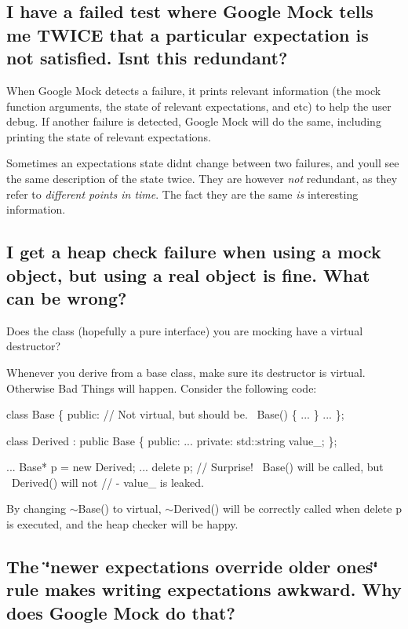 \subsection*{I have a failed test where Google Mock tells me T\+W\+I\+CE that a particular expectation is not satisfied. Isn\textquotesingle{}t this redundant?}

When Google Mock detects a failure, it prints relevant information (the mock function arguments, the state of relevant expectations, and etc) to help the user debug. If another failure is detected, Google Mock will do the same, including printing the state of relevant expectations.

Sometimes an expectation\textquotesingle{}s state didn\textquotesingle{}t change between two failures, and you\textquotesingle{}ll see the same description of the state twice. They are however {\itshape not} redundant, as they refer to {\itshape different points in time}. The fact they are the same {\itshape is} interesting information.

\subsection*{I get a heap check failure when using a mock object, but using a real object is fine. What can be wrong?}

Does the class (hopefully a pure interface) you are mocking have a virtual destructor?

Whenever you derive from a base class, make sure its destructor is virtual. Otherwise Bad Things will happen. Consider the following code\+:


\begin{DoxyCode}
class Base \{
 public:
  // Not virtual, but should be.
  ~Base() \{ ... \}
  ...
\};

class Derived : public Base \{
 public:
  ...
 private:
  std::string value\_;
\};

...
  Base* p = new Derived;
  ...
  delete p;  // Surprise! ~Base() will be called, but ~Derived() will not
             // - value\_ is leaked.
\end{DoxyCode}


By changing {\ttfamily $\sim$\+Base()} to virtual, {\ttfamily $\sim$\+Derived()} will be correctly called when {\ttfamily delete p} is executed, and the heap checker will be happy.

\subsection*{The \char`\"{}newer expectations override older ones\char`\"{} rule makes writing expectations awkward. Why does Google Mock do that?}

